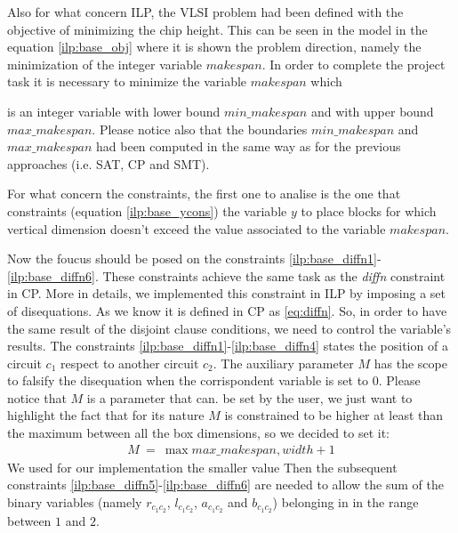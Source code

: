     Also for what concern ILP, the VLSI problem had been defined with the objective of minimizing 
    the chip height. This can be seen in the model in the equation \ref{ilp:base_obj} where it is
    shown the problem direction, namely the minimization of the integer variable \(makespan\).
    In order to complete the project task it is necessary to minimize the variable \(makespan\) which

    is an integer variable with lower bound \(min\_makespan\) and with upper bound \(max\_makespan\).
    Please notice also that the  boundaries \(min\_makespan\) and \(max\_makespan\) had been computed
    in the same way as for the previous approaches (i.e. SAT, CP and SMT).

    For what concern the constraints, the first one to analise is the one that constraints
    (equation \ref{ilp:base_ycons}) the variable \(y\) to place blocks for which vertical dimension
    doesn't exceed the value associated to the variable \(makespan\).

    Now the foucus should be posed on the constraints \ref{ilp:base_diffn1}-\ref{ilp:base_diffn6}.
    These constraints achieve the same task as the \textit{diffn} constraint in CP. More in
    details, we implemented this constraint in ILP by imposing a set of disequations. As we know
    it is defined in CP as \ref{eq:diffn}. So, in order to have the same result of the disjoint
    clause conditions, we need to control the variable's results. The constraints 
    \ref{ilp:base_diffn1}-\ref{ilp:base_diffn4} states the position of a circuit \(c_1\) respect to
    another circuit \(c_2\). The auxiliary parameter \(M\) has the scope to falsify the disequation
    when the corrispondent variable is set to 0. Please notice that \(M\) is a parameter that can.
    be set by the user, we just want to highlight the fact that for its nature \(M\) is constrained
    to be higher at least than the maximum between all the box dimensions, so we decided to set it:
    \begin{align*}
        M\ =\ \max{max\_makespan, width} + 1 
    \end{align*}
    We used for our implementation the smaller value Then the subsequent constraints 
    \ref{ilp:base_diffn5}-\ref{ilp:base_diffn6} are needed to allow the sum of the binary variables 
    (namely \(r_{c_1c_2}\), \(l_{c_1c_2}\), \(a_{c_1c_2}\) and \(b_{c_1c_2}\)) belonging in in the range
    between \(1\) and \(2\). \\
    
